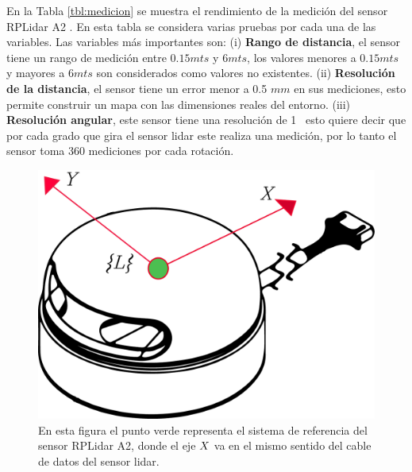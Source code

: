 En la Tabla \ref{tbl:medicion} se muestra el rendimiento de la medición del 
sensor RPLidar A2 \cite{Slamtec}. En esta tabla se considera varias pruebas 
por cada una de las variables. Las variables más importantes son: (i) 
\textbf{Rango de distancia}, el sensor tiene un rango de medición entre $0.15 
mts$ y $6 mts$, los valores menores a $0.15 mts$ y mayores a $6 mts$ son 
considerados como valores no existentes. (ii) \textbf{Resolución de la 
distancia}, el sensor tiene un error menor a 0.5 $mm$ en sus mediciones, esto 
permite construir un mapa con las dimensiones reales del entorno. (iii) 
\textbf{Resolución angular}, este sensor tiene una resolución de 1\grad~ esto 
quiere decir que por cada grado que gira el sensor lidar este realiza una medición, 
por lo tanto el sensor toma 360 mediciones por cada rotación.

\begin{figure}
	\centering \footnotesize
	\includegraphics[width=0.40\linewidth]{images/frame_laser.png}
	\captionsetup{font=footnotesize}
	\caption{En esta figura el punto verde representa el sistema de referencia 
	del sensor RPLidar A2, donde el eje $\mathnormal X$ va en el mismo sentido del cable 
	de datos del sensor lidar.}
	\label{fig:FrameLidar}
\end{figure}

